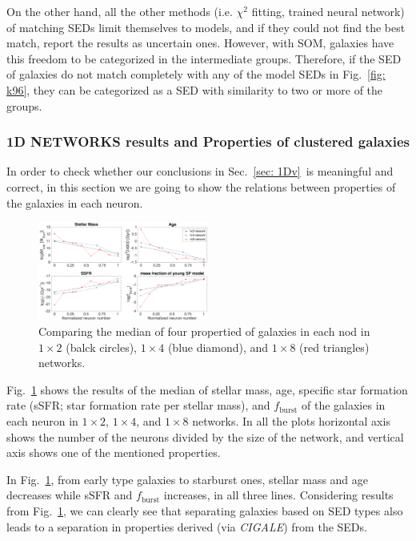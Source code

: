 \documentclass[useAMS,usenatbib]{mn2e}
\begin{document}
            On the other hand, all the other methods (i.e. $\chi^2$ fitting, trained neural network) of matching SEDs limit themselves to models, and if they could not find the best match, report the results as uncertain ones.
            However, with SOM, galaxies have this freedom to be categorized in the intermediate groups.
            Therefore, if the SED of galaxies do not match completely with any of the model SEDs in Fig.~\ref{fig: k96}, they can be categorized as a SED with similarity to two or more of the groups.

                        
        
        
        \subsubsection{1D NETWORKS results and Properties of clustered galaxies}
        
        In order to check whether our conclusions in Sec.~\ref{sec: 1Dv}~is meaningful and correct, in this section we are going to show the relations between properties of the galaxies in each neuron.
        
        \begin{figure}
            \centering
            \includegraphics[width=0.5\textwidth]{images0.01/1d/props5.png}
            \caption{Comparing the median of four propertied of galaxies in each nod in $1\times2$ (balck circles), $1\times4$ (blue diamond), and $1\times8$ (red triangles) networks.}
            \label{fig: props}
        \end{figure}
       
        Fig.~\ref{fig: props} shows the results of the median of stellar mass, age, specific star formation rate (sSFR; star formation rate per stellar mass), and $f_\mathrm{burst}$ of the galaxies in each neuron in $1\times2$, $1\times4$, and $1\times8$ networks.
        In all the plots horizontal axis shows the number of the neurons divided by the size of the network, and vertical axis shows one of the mentioned properties.
        
        In Fig.~\ref{fig: props}, from early type galaxies to starburst ones, stellar mass and age decreases while sSFR and $f_\mathrm{burst}$ increases, in all three lines. 
        Considering results from Fig.~\ref{fig: props}, we can clearly see that separating galaxies based on SED types also leads to a separation in properties derived (via {\em CIGALE}) from the SEDs.
    
\end{document}
